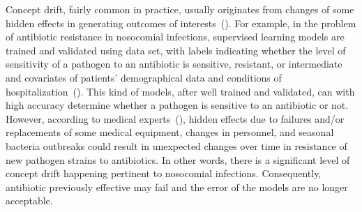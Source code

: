 \documentclass[twoside,11pt]{article}
\begin{document}
Concept drift, fairly common in practice, usually originates from changes of some hidden effects in generating outcomes of interests~(\cite{tsymbal2008dynamic,vzliobaite2012beating,widmer1996learning,kukar2003drifting,donoho2004early,vzliobaite2016overview}). For example, in the problem of antibiotic resistance in nosocomial infections, supervised learning models are trained and validated using data set, with labels indicating whether the level of sensitivity of a pathogen to an antibiotic is sensitive, resistant, or intermediate and covariates of patients' demographical data and conditions of hospitalization~(\cite{pechenizkiy2005knowledge}). This kind of models, after well trained and validated, can with high accuracy determine whether a pathogen is sensitive to an antibiotic or not. However, according to medical experts~(\cite{kukar2003drifting}), hidden effects due to failures and/or replacements of some medical equipment, changes in personnel, and seasonal bacteria outbreaks could result in unexpected changes over time in resistance of new pathogen strains to antibiotics. In other words, there is a significant level of concept drift happening pertinent to nosocomial infections. Consequently, antibiotic previously effective may fail and the error of the models are no longer acceptable. 

\end{document}
